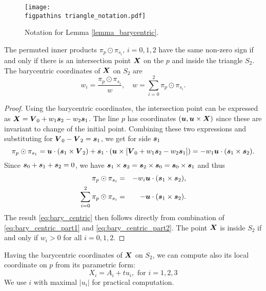 \begin{figure}[!htb]
    \centering
    \texttt{[image: \\figpathins triangle\_notation.pdf]}
    \caption{Notation for Lemma \ref{lemma_barycentric}.    }
    \label{fig:triangle_notation}
\end{figure}

\begin{lemma}
\label{lemma_barycentric}
The permuted inner products $\pi_p \odot \pi_{s_i},\, i=0,1,2$ have the same non-zero sign if and only if there
is an intersection point $\mathbf{\boldsymbol{X}}$ on the $p$ and inside the triangle $S_2$. 
The barycentric coordinates of $\mathbf{\boldsymbol{X}}$ on $S_2$ are
\begin{equation}
  \label{eq:bary_centric}
   w_i = \frac{\pi_p \odot \pi_{s_i}}{w},\quad w=\sum_{i=0}^{2} \pi_p \odot \pi_{s_i}.
\end{equation}
\end{lemma}
\begin{proof}
Using the barycentric coordinates, the intersection point can be expressed as $\mathbf{\boldsymbol{X}} = \mathbf{\boldsymbol{V}}_0 + w_1 \mathbf{\boldsymbol{s}}_2 - w_2 \mathbf{\boldsymbol{s}}_1$.
The line $p$ has \plucker coordinates $(\mathbf{\boldsymbol{u}}, \mathbf{\boldsymbol{u}} \times \mathbf{\boldsymbol{X}})$ since these are invariant to change of the initial point. 
Combining these two expressions and substituting for $\mathbf{\boldsymbol{V}}_0-\mathbf{\boldsymbol{V}}_2=\mathbf{\boldsymbol{s}}_1$, we get for side $\mathbf{\boldsymbol{s}}_1$
\[
   \pi_p \odot \pi_{s_1} = \mathbf{\boldsymbol{u}} \cdot (\mathbf{\boldsymbol{s}}_1 \times \mathbf{\boldsymbol{V}}_2) + \mathbf{\boldsymbol{s}}_1 \cdot ( \mathbf{\boldsymbol{u}} \times [\mathbf{\boldsymbol{V}}_0 + w_1\mathbf{\boldsymbol{s}}_2 - w_2 \mathbf{\boldsymbol{s}}_1])
   =-w_1 \mathbf{\boldsymbol{u}} \cdot (\mathbf{\boldsymbol{s}}_1 \times \mathbf{\boldsymbol{s}}_2).
\]
Since $\mathbf{\boldsymbol{s}}_0 + \mathbf{\boldsymbol{s}}_1 + \mathbf{\boldsymbol{s}}_2=0$, we have $ \mathbf{\boldsymbol{s}}_1 \times \mathbf{\boldsymbol{s}}_2 = \mathbf{\boldsymbol{s}}_2 \times \mathbf{\boldsymbol{s}}_0 = \mathbf{\boldsymbol{s}}_0 \times \mathbf{\boldsymbol{s}}_1$ and thus
\begin{eqnarray}
   \pi_p \odot \pi_{s_i} &=& -w_i \mathbf{\boldsymbol{u}} \cdot (\mathbf{\boldsymbol{s}}_1 \times \mathbf{\boldsymbol{s}}_2), \label{eq:bary_centric_part1}\\
   \sum_{i=0}^{2} \pi_p \odot \pi_{s_i} &=& - \mathbf{\boldsymbol{u}} \cdot (\mathbf{\boldsymbol{s}}_1 \times \mathbf{\boldsymbol{s}}_2). \label{eq:bary_centric_part2}
\end{eqnarray}
The result \eqref{eq:bary_centric} then follows directly from combination of \eqref{eq:bary_centric_part1} and \eqref{eq:bary_centric_part2}.
The point $\mathbf{\boldsymbol{X}}$ is inside $S_2$ if and only if $w_i>0$ for all $i=0,1,2$.
\end{proof}
Having the barycentric coordinates of $\mathbf{\boldsymbol{X}}$ on $S_2$, we can compute also its local coordinate on $p$ from its parametric form:
\begin{equation}
   \label{eq:line}
   X_i  = A_i + t u_i, \text{ for } i=1,2,3
\end{equation}
We use $i$ with maximal $|u_i|$ for practical computation. 

